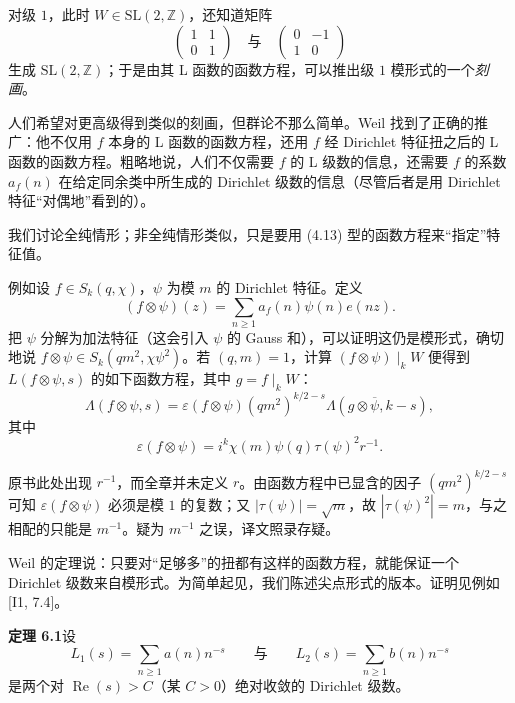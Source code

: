 对级 $1$，此时 $W\in\mathrm{SL}(2,\mathbb{Z})$，还知道矩阵
\[
\begin{pmatrix}1&1\\0&1\end{pmatrix}\quad\text{与}\quad\begin{pmatrix}0&-1\\1&0\end{pmatrix}
\]
生成 $\mathrm{SL}(2,\mathbb{Z})$；于是由其 L 函数的函数方程，可以推出级 $1$ 模形式的一个\emph{刻画}。

人们希望对更高级得到类似的刻画，但群论不那么简单。Weil 找到了正确的推广：他不仅用 $f$ 本身的 L 函数的函数方程，还用 $f$ 经 Dirichlet 特征扭之后的 L 函数的函数方程。粗略地说，人们不仅需要 $f$ 的 L 级数的信息，还需要 $f$ 的系数 $a_{f}(n)$ 在给定同余类中所生成的 Dirichlet 级数的信息（尽管后者是用 Dirichlet 特征“对偶地”看到的）。

我们讨论全纯情形；非全纯情形类似，只是要用 (4.13) 型的函数方程来“指定”特征值。

例如设 $f\in S_{k}(q,\chi)$，$\psi$ 为模 $m$ 的 Dirichlet 特征。定义
\[
(f\otimes\psi)(z)=\sum_{n\ge1}a_{f}(n)\psi(n)e(nz).
\]
把 $\psi$ 分解为加法特征（这会引入 $\psi$ 的 Gauss 和），可以证明这仍是模形式，确切地说 $f\otimes\psi\in S_{k}(qm^{2},\chi\psi^{2})$。若 $(q,m)=1$，计算 $(f\otimes\psi)\mid_{k}W$ 便得到 $L(f\otimes\psi,s)$ 的如下函数方程，其中 $g=f\mid_{k}W$：
\[
\Lambda(f\otimes\psi,s)=\varepsilon(f\otimes\psi)(qm^{2})^{k/2-s}\Lambda(g\otimes\overline{\psi},k-s),
\]
其中
\begin{equation}\tag{6.1}\label{c3:eq:6.1}
\varepsilon(f\otimes\psi)=i^{k}\chi(m)\psi(q)\tau(\psi)^{2}r^{-1}.
\end{equation}

\begin{annote}
原书此处出现 $r^{-1}$，而全章并未定义 $r$。由函数方程中已显含的因子 $(qm^{2})^{k/2-s}$ 可知 $\varepsilon(f\otimes\psi)$ 必须是模 $1$ 的复数；又 $|\tau(\psi)|=\sqrt{m}$，故 $|\tau(\psi)^{2}|=m$，与之相配的只能是 $m^{-1}$。疑为 $m^{-1}$ 之误，译文照录存疑。
\par\vspace{0.15em}{\raggedleft 【来源：原书 §6.1（A）；Iwaniec《Topics in Classical Automorphic Forms》7.4 节（A）】\par}
\end{annote}
Weil 的定理说：只要对“足够多”的扭都有这样的函数方程，就能保证一个 Dirichlet 级数来自模形式。为简单起见，我们陈述尖点形式的版本。证明见例如 [I1, 7.4]。

\par\medskip\noindent\textbf{定理 6.1}\quad 设
\[
L_{1}(s)=\sum_{n\ge1}a(n)n^{-s}\qquad\text{与}\qquad L_{2}(s)=\sum_{n\ge1}b(n)n^{-s}
\]
是两个对 $\operatorname{Re}(s)>C$（某 $C>0$）绝对收敛的 Dirichlet 级数。

